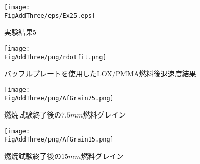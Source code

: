 \begin{figure}                                     
\centering                                         
\texttt{[image: \\FigAddThree/eps/Ex25.eps]}
\caption{実験結果5}
\label{fig:S2Case5}
\end{figure}


\begin{figure}
\centering
\texttt{[image: \\FigAddThree/png/rdotfit.png]}
\caption{バッフルプレートを使用したLOX/PMMA燃料後退速度結果}
\label{fig:S3RegressionRate}
\end{figure}

\begin{figure}
\centering
\texttt{[image: \\FigAddThree/png/AfGrain75.png]}
\caption{燃焼試験終了後の$7.5mm$燃料グレイン}
\label{fig:S3Case1Grain}
\end{figure}

\begin{figure}
\centering
\texttt{[image: \\FigAddThree/png/AfGrain15.png]}
\caption{燃焼試験終了後の$15mm$燃料グレイン}
\label{fig:S3Case5Grain}
\end{figure}
